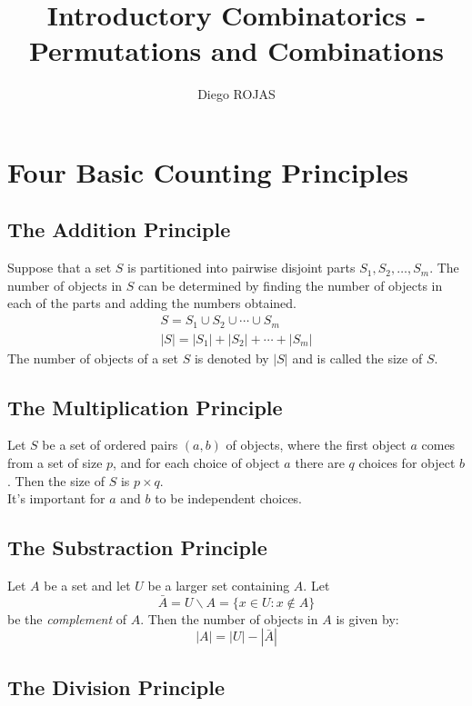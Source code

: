 \documentclass[12pt]{article}
\title{Introductory Combinatorics - Permutations and Combinations}
\author{Diego ROJAS}
\begin{document}
\maketitle

\tableofcontents

\section{Four Basic Counting Principles}

\subsection{The Addition Principle}

Suppose that a set $S$ is partitioned into pairwise disjoint parts $S_1,S_2, \dots ,S_m$. The number of objects in $S$ can be determined by finding the number of objects in each of the parts and adding the numbers obtained.
%
\begin{equation}
\begin{gathered}
	S = S_1 \cup S_2 \cup \cdots \cup S_m \\
	|S| = |S_1| + |S_2| + \cdots + |S_m|
\end{gathered}
\end{equation}
%
The number of objects of a set $S$ is denoted by $|S|$ and is called the size of $S$.

\subsection{The Multiplication Principle}

Let $S$ be a set of ordered pairs $(a, b)$ of objects, where the first object $a$ comes from a set of size $p$, and for each choice of object $a$ there are $q$ choices for object $b$. Then the size of $S$ is $p \times q$.
\\
It's important for $a$ and $b$ to be independent choices.


\subsection{The Substraction Principle}

Let $A$ be a set and let $U$ be a larger set containing $A$. Let
%
$$
\bar{A} = U \backslash A = \{ x \in U : x \notin A \}
$$
%
be the \textit{complement} of $A$. Then the number of objects in $A$ is given by:
%
$$
|A| = |U| - |\bar{A}|
$$

\subsection{The Division Principle}
\end{document}
